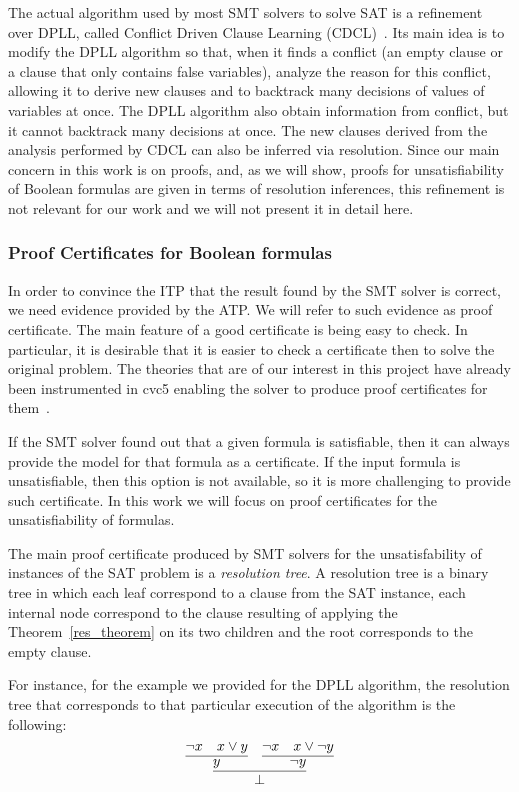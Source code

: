 The actual algorithm used by most SMT solvers to solve SAT is a refinement over DPLL, called Conflict Driven Clause Learning (CDCL)~\cite{cdcl}. Its main idea is to modify the DPLL algorithm so that, when it finds a conflict (an empty clause or a clause that only contains false variables), analyze the reason for this conflict, allowing it to derive new clauses and to backtrack many decisions of values of variables at once.
The DPLL algorithm also obtain information from conflict, but it cannot backtrack many decisions at once.
The new clauses derived from the analysis performed by CDCL can also be inferred via resolution.
Since our main concern in this work is on proofs, and, as we will show, proofs for unsatisfiability
of Boolean formulas are given in terms of resolution inferences, this refinement is not relevant
for our work and we will not present it in detail here.

\subsubsection{Proof Certificates for Boolean formulas}\label{sec:pcBool}

In order to convince the ITP that the result found by the SMT solver is correct, we need evidence provided by the
ATP.
%
We will refer to such evidence as proof certificate.
%
The main feature of a good certificate is being easy to check.
%
In particular, it is desirable that it is easier to check a certificate then to solve the original problem.
%
The theories that are of our interest in this project have already been instrumented in cvc5 enabling the solver to produce proof certificates for them~\cite{Barbosa2022}.

If the SMT solver found out that a given formula is satisfiable, then it can always provide the model for that formula as a certificate. If the input formula is unsatisfiable, then this option is not available, so it is more challenging to provide such certificate. In this work we will focus on proof certificates for the unsatisfiability of formulas.

The main proof certificate produced by SMT solvers for the unsatisfability of instances of the SAT problem is
a \textit{resolution tree}. A resolution tree is a binary tree in which each leaf correspond to a clause from the SAT instance, each internal node correspond to the clause resulting of applying the Theorem~\ref{res_theorem} on its two children and the root corresponds to the empty clause.

For instance, for the example we provided for the DPLL algorithm, the resolution tree that corresponds to that
particular execution of the algorithm is the following:
\[
  \infer{\bot}{\infer{y}{\neg x & x \vee y} & \infer{\neg y}{\neg x & x \vee \neg y}}
\]


